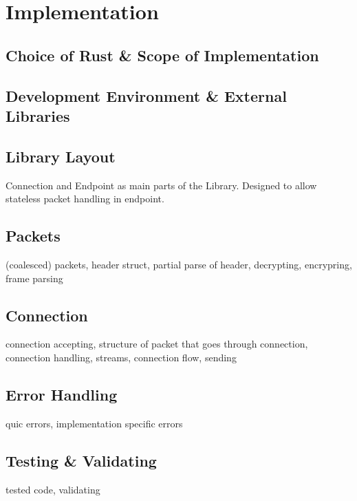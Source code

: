 \chapter{Implementation}

\section{Choice of Rust \& Scope of Implementation}

\section{Development Environment \& External Libraries}

\section{Library Layout}

Connection and Endpoint as main parts of the Library. Designed to allow stateless packet handling in endpoint.

\section{Packets}

(coalesced) packets, header struct, partial parse of header, decrypting, encrypring, frame parsing

\section{Connection}

connection accepting, structure of packet that goes through connection, connection handling, streams, connection flow, sending

\section{Error Handling}

quic errors, implementation specific errors

\section{Testing \& Validating}

tested code, validating